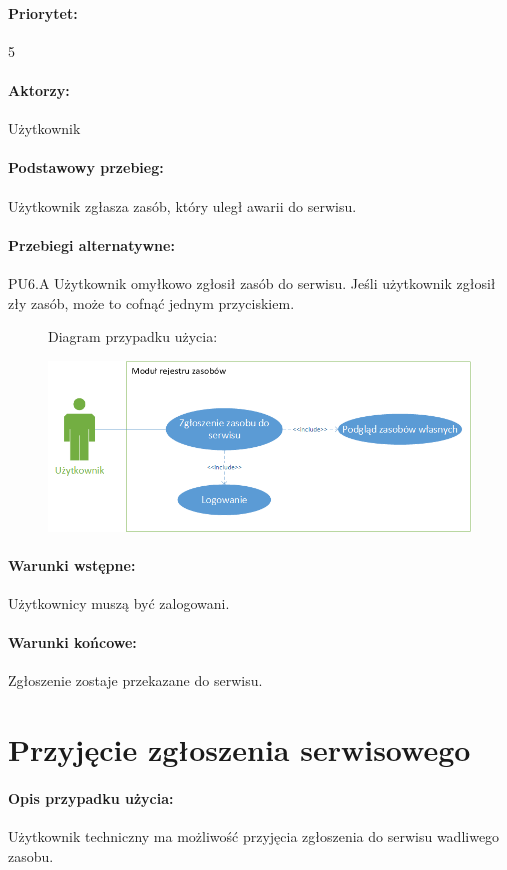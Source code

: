 \documentclass[11pt, a4paper, oneside]{report}
\begin{document}
\paragraph{Priorytet:} 5
\paragraph{Aktorzy:} Użytkownik
\paragraph{Podstawowy przebieg:}
Użytkownik zgłasza zasób, który uległ awarii do serwisu.
\paragraph{Przebiegi alternatywne:}
PU6.A Użytkownik omyłkowo zgłosił zasób do serwisu.
\newline Jeśli użytkownik zgłosił zły zasób, może to cofnąć jednym przyciskiem.
\begin{figure}[H]
Diagram przypadku użycia:

\centering
\includegraphics[scale=0.8]{uzytkownik_zgloszenie_do_serwisu.png}
\end{figure}

\paragraph{Warunki wstępne:} Użytkownicy muszą być zalogowani.
\paragraph{Warunki końcowe:} Zgłoszenie zostaje przekazane do serwisu.


\section{Przyjęcie zgłoszenia serwisowego}
\paragraph{Opis przypadku użycia:} Użytkownik techniczny ma możliwość przyjęcia zgłoszenia do serwisu wadliwego zasobu.
\end{document}
